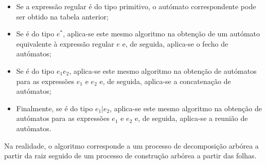 \documentclass{article}
\begin{document}
\begin{flushleft}
  \begin{itemize}
    \item Se a expressão regular é do tipo primitivo, o autómato correspondente pode ser obtido na tabela anterior;
    \item Se é do tipo $e^*$, aplica-se este mesmo algoritmo na obtenção de um autómato equivalente à expressão regular
    $e$ e, de seguida, aplica-se o fecho de autómatos;
    \item Se é do tipo $e_1e_2$, aplica-se este mesmo algoritmo na obtenção de autómatos para as expressões $e_1$ e $e_2$ e, de seguida,
    aplica-se a concatenação de autómatos;
    \item Finalmente, se é do tipo $e_1 | e_2$, aplica-se este mesmo algoritmo na obtenção de autómatos para as expressões $e_1$ e $e_2$ e, de seguida,
    aplica-se a reunião de autómatos.
  \end{itemize}

  \item Na realidade, o algoritmo corresponde a um processo de decomposição arbórea a partir da raiz seguido de um processo de construção
  arbórea a partir das folhas.
\end{flushleft}
\end{document}
